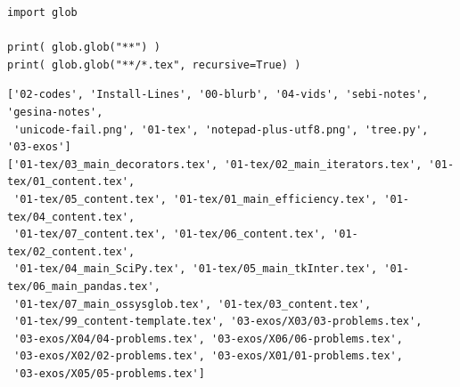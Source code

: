 \begin{frame}[fragile]
%
\begin{codebox}
\begin{verbatim}
import glob

print( glob.glob("**") )
print( glob.glob("**/*.tex", recursive=True) )
\end{verbatim}
\end{codebox}
%
\begin{cmdbox}
\begin{verbatim}
['02-codes', 'Install-Lines', '00-blurb', '04-vids', 'sebi-notes', 'gesina-notes',
 'unicode-fail.png', '01-tex', 'notepad-plus-utf8.png', 'tree.py', '03-exos']
['01-tex/03_main_decorators.tex', '01-tex/02_main_iterators.tex', '01-tex/01_content.tex',
 '01-tex/05_content.tex', '01-tex/01_main_efficiency.tex', '01-tex/04_content.tex',
 '01-tex/07_content.tex', '01-tex/06_content.tex', '01-tex/02_content.tex',
 '01-tex/04_main_SciPy.tex', '01-tex/05_main_tkInter.tex', '01-tex/06_main_pandas.tex',
 '01-tex/07_main_ossysglob.tex', '01-tex/03_content.tex',
 '01-tex/99_content-template.tex', '03-exos/X03/03-problems.tex',
 '03-exos/X04/04-problems.tex', '03-exos/X06/06-problems.tex',
 '03-exos/X02/02-problems.tex', '03-exos/X01/01-problems.tex',
 '03-exos/X05/05-problems.tex']
\end{verbatim}
\end{cmdbox}
%
\end{frame}


